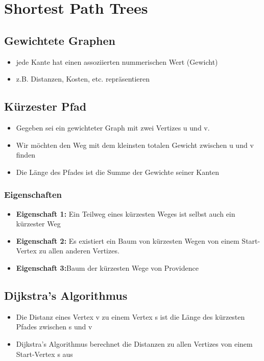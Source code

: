 \section{Shortest Path Trees}

\subsection{Gewichtete Graphen}
\begin{itemize}
    \item jede Kante hat einen assoziierten nummerischen Wert (Gewicht)
    \item z.B. Distanzen, Kosten, etc. repräsentieren
\end{itemize}

\subsection{Kürzester Pfad}
\begin{itemize}
    \item Gegeben sei ein gewichteter Graph mit zwei Vertizes u und v.
    \item Wir möchten den Weg mit dem kleinsten totalen Gewicht zwischen u und v finden
    \item Die Länge des Pfades ist die Summe der Gewichte seiner Kanten
\end{itemize}
\subsubsection{Eigenschaften}
\begin{itemize}
    \item \textbf{Eigenschaft 1:} Ein Teilweg eines kürzesten Weges ist selbst auch ein kürzester Weg
    \item \textbf{Eigenschaft 2:} Es existiert ein Baum von kürzesten Wegen von einem Start-Vertex zu allen anderen Vertizes.
    \item \textbf{Eigenschaft 3:}Baum der kürzesten Wege von Providence
\end{itemize}

\subsection{Dijkstra’s Algorithmus}
\begin{itemize}
    \item Die Distanz eines Vertex v zu einem Vertex s ist die Länge des kürzesten Pfades zwischen s und v
    \item Dijkstra’s Algorithmus berechnet die Distanzen zu allen Vertizes von einem Start-Vertex s aus
\end{itemize}

